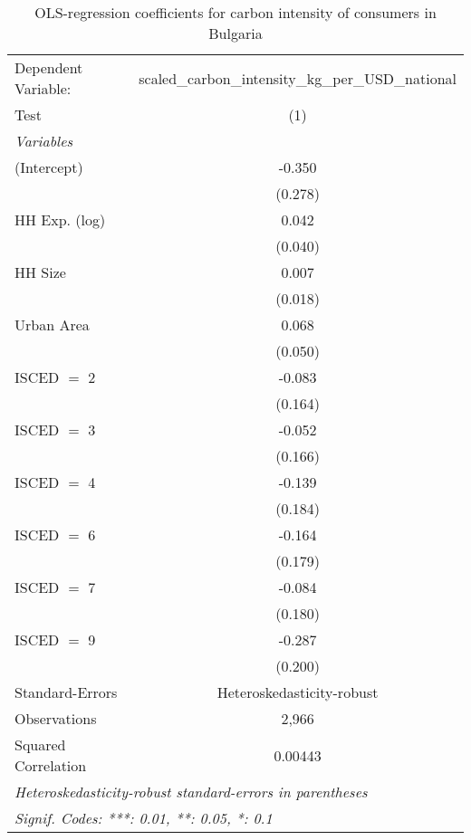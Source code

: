 
\begin{table}[htbp!]
   \centering
   \small
   \begin{adjustbox}{width = 1\textwidth, max height = 0.95\textheight, center}
      \begin{threeparttable}[b]
         \caption{\label{tab:OLS_1_BGR} OLS-regression coefficients for carbon intensity of consumers in Bulgaria}
         \begin{tabular}{lc}
            \tabularnewline \midrule \midrule
            Dependent Variable: & scaled\_carbon\_intensity\_kg\_per\_USD\_national\\        
            Test                & (1)\\  
            \midrule
            \emph{Variables}\\
            (Intercept)         & -0.350\\   
                                & (0.278)\\   
            HH Exp. (log)       & 0.042\\   
                                & (0.040)\\   
            HH Size             & 0.007\\   
                                & (0.018)\\   
            Urban Area          & 0.068\\   
                                & (0.050)\\   
            ISCED $=$ 2         & -0.083\\   
                                & (0.164)\\   
            ISCED $=$ 3         & -0.052\\   
                                & (0.166)\\   
            ISCED $=$ 4         & -0.139\\   
                                & (0.184)\\   
            ISCED $=$ 6         & -0.164\\   
                                & (0.179)\\   
            ISCED $=$ 7         & -0.084\\   
                                & (0.180)\\   
            ISCED $=$ 9         & -0.287\\   
                                & (0.200)\\   
            \midrule 
            Standard-Errors     & Heteroskedasticity-robust \\   
            Observations        & 2,966\\  
            Squared Correlation & 0.00443\\  
            \midrule \midrule
            \multicolumn{2}{l}{\emph{Heteroskedasticity-robust standard-errors in parentheses}}\\
            \multicolumn{2}{l}{\emph{Signif. Codes: ***: 0.01, **: 0.05, *: 0.1}}\\
         \end{tabular}
         

\end{threeparttable}
\end{adjustbox}
\end{table}
